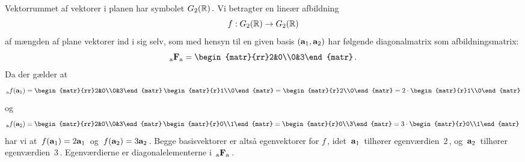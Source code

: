 \begin{example}\label{drejningAfHuse}
Vektorrummet af vektorer i planen har symbolet $G_2(\mathbb{R})\,.$ Vi betragter en lineær afbildning
\begin{equation}\label{G3_egenvektorEks}
f:G_2(\mathbb{R})\rightarrow G_2(\mathbb{R})
\end{equation}
af mængden af plane vektorer ind i sig selv, som med hensyn til en given basis $(\mathbf{a}_1,\mathbf{a}_2)$ har følgende diagonalmatrix som afbildningsmatrix:
\begin{equation}\label{2x2diagM}
\matind aFa=\begin{matr}{rr}2&0\\0&3\end{matr}\,.
\end{equation}
Da der gælder at 
\begin{equation*}
_\mathrm{a}f(\ma_1)=\begin{matr}{rr}2&0\\0&3\end{matr}\,\begin{matr}{r}1\\0\end{matr}=\begin{matr}{r}2\\0\end{matr}=
2\cdot\begin{matr}{r}1\\0\end{matr}\end{equation*}
og
\begin{equation*}
_\mathrm{a}f(\ma_2)=\begin{matr}{rr}2&0\\0&3\end{matr}\,\begin{matr}{r}0\\1\end{matr}=
\begin{matr}{r}0\\3\end{matr}=
3\cdot\begin{matr}{r}0\\1\end{matr}\,
\end{equation*}
har vi at $\,f(\mathbf{a}_1)=2\mathbf{a}_1\,$ og $\,f(\mathbf{a}_2)=3\mathbf{a}_2\,$. Begge basisvektorer er altså egenvektorer for $f\,$, idet $\,\mathbf{a}_1\,$ tilhører egenværdien $\,2\,$, og $\,\mathbf{a}_2\,$ tilhører egenværdien $\,3\,$. Egenværdierne er diagonalelementerne i $\,{_\mathrm{a}\mathbf{F}_\mathrm{a}}\,$.\\


\end{example}
